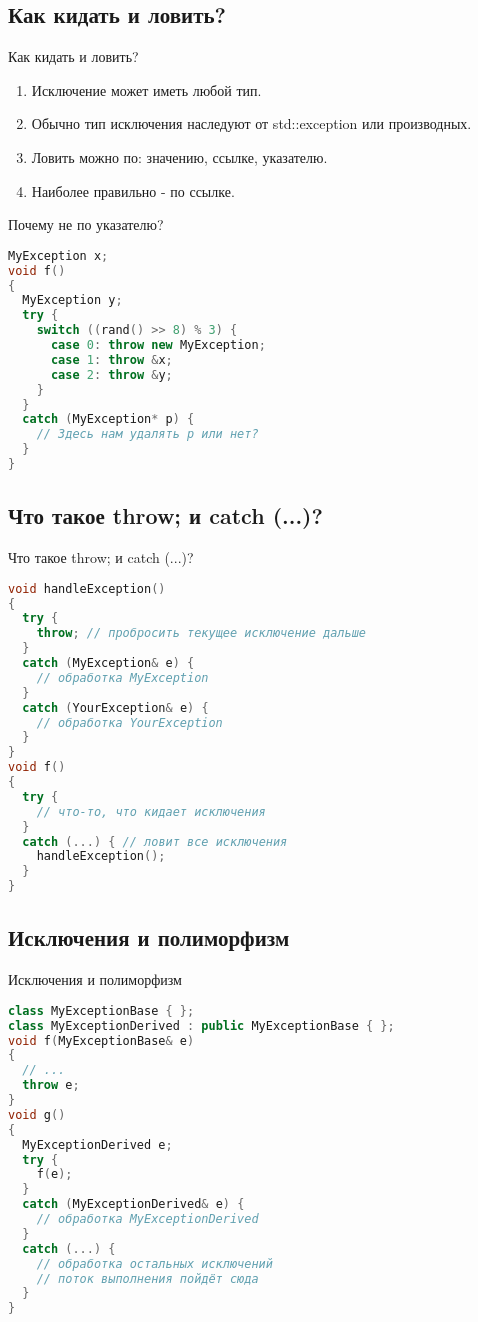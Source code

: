 \documentclass[10pt]{beamer}
\begin{document}
\subsection{Как кидать и ловить?}
\begin{frame}[fragile]{Как кидать и ловить?}
\begin{enumerate}
    \item Исключение может иметь любой тип.
    \item Обычно тип исключения наследуют от std::exception или производных.
    \item Ловить можно по: значению, ссылке, указателю.
    \item Наиболее правильно - по ссылке.
\end{enumerate}
\end{frame}

\begin{frame}[fragile]{Почему не по указателю?}
\begin{lstlisting}[language=C++]
MyException x;
void f()
{
  MyException y;
  try {
    switch ((rand() >> 8) % 3) {
      case 0: throw new MyException;
      case 1: throw &x;
      case 2: throw &y;
    }
  }
  catch (MyException* p) {
    // Здесь нам удалять p или нет?
  }
}
\end{lstlisting}
\end{frame}

\subsection{Что такое throw; и catch (...)?}
\begin{frame}[fragile]{Что такое throw; и catch (...)?}
\begin{lstlisting}[language=C++]
void handleException()
{
  try {
    throw; // пробросить текущее исключение дальше
  }
  catch (MyException& e) {
    // обработка MyException
  }
  catch (YourException& e) {
    // обработка YourException
  }
}
void f()
{
  try {
    // что-то, что кидает исключения
  }
  catch (...) { // ловит все исключения
    handleException();
  }
}
\end{lstlisting}
\end{frame}


\subsection{Исключения и полиморфизм}
\begin{frame}[fragile]{Исключения и полиморфизм}
\begin{lstlisting}[language=C++]
class MyExceptionBase { };
class MyExceptionDerived : public MyExceptionBase { };
void f(MyExceptionBase& e)
{
  // ...
  throw e;
}
void g()
{
  MyExceptionDerived e;
  try {
    f(e);
  }
  catch (MyExceptionDerived& e) {
    // обработка MyExceptionDerived
  }
  catch (...) {
    // обработка остальных исключений
    // поток выполнения пойдёт сюда
  }
}
\end{lstlisting}
\end{frame}
\end{document}
